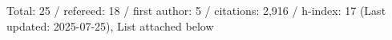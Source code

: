 Total: 25 / refereed: 18 / first author: 5 / citations: 2,916 / h-index: 17 (Last updated: 2025-07-25), List attached below